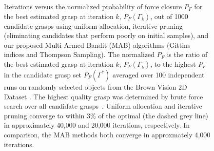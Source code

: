 \documentclass[10pt, conference]{ieeeconf}      %
\begin{document}
\begin{figure}
    \caption{Iterations versus the normalized probability of force closure $P_F$ for the best estimated grasp at iteration $k$, $P_F(\Gamma_{\bar{k}})$, out of 1000 candidate grasps using uniform allocation, iterative pruning (eliminating candidates that perform poorly on initial samples), and our proposed Multi-Armed Bandit (MAB) algorithms (Gittins indices and Thompson Sampling).
    The normalized $P_F$ is the ratio of the best estimated grasp at iteration $k$, $P_F(\Gamma_{\bar{k}})$, to the highest $P_F$ in the candidate grasp set $P_F(\Gamma^*)$ averaged over 100 independent runs on randomly selected objects from the Brown Vision 2D Dataset \cite{brown}.
    The highest quality grasp was determined by brute force search over all candidate grasps~\cite{kehoe2012toward}.
    Uniform allocation and iterative pruning converge to within 3$\%$ of the optimal (the dashed grey line) in approximately 40,000 and 20,000 iterations, respectively.
    In comparison, the MAB methods both converge in approxmately 4,000 iterations. 
%    
	}
    \label{fig:grasp_quality}
\end{figure}
\end{document}
